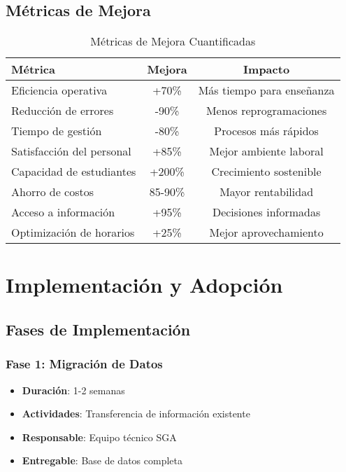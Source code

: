 \documentclass[12pt,a4paper]{article}
\begin{document}
\subsection{Métricas de Mejora}

\begin{table}[H]
\centering
\begin{tabular}{|l|c|c|}
\hline
\textbf{Métrica} & \textbf{Mejora} & \textbf{Impacto} \\
\hline
Eficiencia operativa & +70\% & Más tiempo para enseñanza \\
Reducción de errores & -90\% & Menos reprogramaciones \\
Tiempo de gestión & -80\% & Procesos más rápidos \\
Satisfacción del personal & +85\% & Mejor ambiente laboral \\
Capacidad de estudiantes & +200\% & Crecimiento sostenible \\
Ahorro de costos & 85-90\% & Mayor rentabilidad \\
Acceso a información & +95\% & Decisiones informadas \\
Optimización de horarios & +25\% & Mejor aprovechamiento \\
\hline
\end{tabular}
\caption{Métricas de Mejora Cuantificadas}
\end{table}

\section{Implementación y Adopción}

\subsection{Fases de Implementación}

\subsubsection{Fase 1: Migración de Datos}
\begin{itemize}
    \item \textbf{Duración}: 1-2 semanas
    \item \textbf{Actividades}: Transferencia de información existente
    \item \textbf{Responsable}: Equipo técnico SGA
    \item \textbf{Entregable}: Base de datos completa
\end{itemize}
\end{document}
